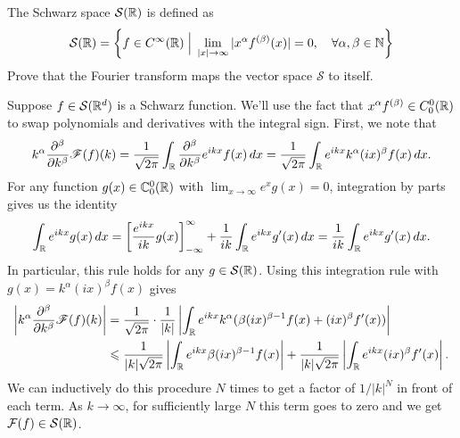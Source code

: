 \documentclass{lkx_pset}
\begin{document}
\begin{problem}{2}
The Schwarz space $\mathcal{S}(\mathbb{R})$ is defined as
\[
	\mathcal{S}(\mathbb{R}) = \left\{ f\in C^\infty(\mathbb{R}) \;\Big\lvert\; \lim_{|x|\to \infty}|x^\alpha f^{(\beta)}(x)|=0, \quad\forall \alpha,\beta\in \mathbb{N}\right\}
\]
Prove that the Fourier transform maps the vector space $\mathcal{S}$ to itself.
\end{problem}
\begin{solution}
	Suppose $f\in \mathcal{S}(\mathbb{R}^d)$ is a Schwarz function. We'll use the fact that $x^\alpha f^{(\beta)}\in C^0_0(\mathbb{R})$ to swap polynomials and derivatives with the integral sign. First, we note that
	\[
		k^\alpha \frac{\partial^\beta}{\partial k^\beta} \mathscr{F}(f)(k) =
		\frac{1}{\sqrt{2\pi}}\int_{\mathbb{R}} \frac{\partial^\beta}{\partial k^\beta}e^{ikx}f(x)\,dx =
		\frac{1}{\sqrt{2\pi}}\int_{\mathbb{R}} e^{ikx} k^\alpha(ix)^\beta f(x)\,dx.
	\]
	For any function $g(x)\in \mathbb{C}^0_0(\mathbb{R})$ with $\lim_{x\to\infty} e^x g(x)=0$, integration by parts gives us the identity
	\[
		\int_{\mathbb{R}} e^{ikx}g(x)\,dx = \left[ \frac{e^{ikx}}{ik}g(x)\right]_{-\infty}^\infty +\frac{1}{ik}\int_{\mathbb{R}} e^{ikx}g'(x)\,dx = \frac{1}{ik}\int_{\mathbb{R}} e^{ikx}g'(x)\,dx.
	\]
	In particular, this rule holds for any $g\in \mathcal{S}(\mathbb{R})$. Using this integration rule with $g(x)=k^\alpha (ix)^\beta f(x)$ gives
	\[
		\begin{aligned}
			\left|k^\alpha\frac{\partial^\beta}{\partial k^\beta}\mathscr{F}(f)(k)\right|
			 & = \frac{1}{\sqrt{2\pi}}\cdot \frac{1}{|k|}\left|\int_{\mathbb{R}} e^{ikx} k^\alpha (\beta(ix)^{\beta-1}f(x)+(ix)^\beta f'(x))\right| \\
			 & \leqslant
			\frac{1}{|k|\sqrt{2\pi}}\left|\int_{\mathbb{R}} e^{ikx} \beta(ix)^{\beta-1}f(x)\right|+
			\frac{1}{|k|\sqrt{2\pi}}\left|\int_{\mathbb{R}} e^{ikx}(ix)^{\beta}f'(x)\right|.
		\end{aligned}
	\]
	We can inductively do this procedure $N$ times to get a factor of $1/|k|^N$ in front of each term. As $k\to \infty$, for sufficiently large $N$ this term goes to zero and we get $\mathcal{F}(f)\in \mathcal{S}(\mathbb{R})$.
\end{solution}
\end{document}
